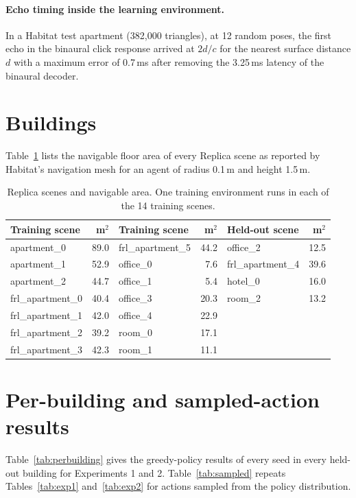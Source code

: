 \paragraph{Echo timing inside the learning environment.} In a Habitat test apartment (382{,}000 triangles), at 12 random poses, the first echo in the binaural click response arrived at $2d/c$ for the nearest surface distance $d$ with a maximum error of 0.7\,ms after removing the 3.25\,ms latency of the binaural decoder.

\section{Buildings}
\label{app:scenes}
Table~\ref{tab:scenes} lists the navigable floor area of every Replica scene as reported by Habitat's navigation mesh for an agent of radius 0.1\,m and height 1.5\,m.

\begin{table}[h]
\caption{Replica scenes and navigable area. One training environment runs in each of the 14 training scenes.}
\label{tab:scenes}
\centering\small
\begin{tabular}{lr@{\hskip 2em}lr@{\hskip 2em}lr}
\toprule
Training scene & m$^2$ & Training scene & m$^2$ & Held-out scene & m$^2$ \\
\midrule
apartment\_0 & 89.0 & frl\_apartment\_5 & 44.2 & office\_2 & 12.5 \\
apartment\_1 & 52.9 & office\_0 & 7.6 & frl\_apartment\_4 & 39.6 \\
apartment\_2 & 44.7 & office\_1 & 5.4 & hotel\_0 & 16.0 \\
frl\_apartment\_0 & 40.4 & office\_3 & 20.3 & room\_2 & 13.2 \\
frl\_apartment\_1 & 42.0 & office\_4 & 22.9 & & \\
frl\_apartment\_2 & 39.2 & room\_0 & 17.1 & & \\
frl\_apartment\_3 & 42.3 & room\_1 & 11.1 & & \\
\bottomrule
\end{tabular}
\end{table}

\section{Per-building and sampled-action results}
\label{app:perbuilding}
Table~\ref{tab:perbuilding} gives the greedy-policy results of every seed in every held-out building for Experiments 1 and 2. Table~\ref{tab:sampled} repeats Tables~\ref{tab:exp1} and~\ref{tab:exp2} for actions sampled from the policy distribution.

